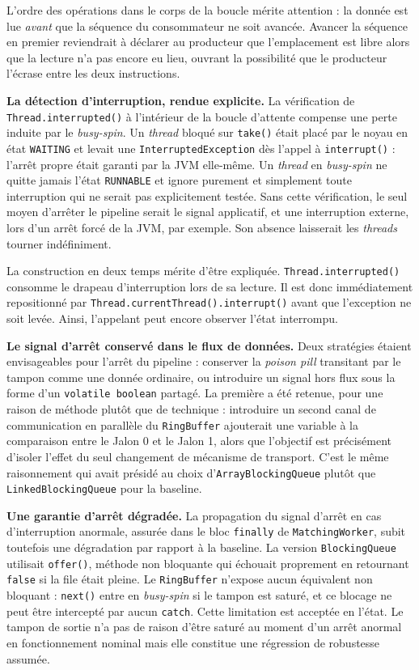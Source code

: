 L'ordre des opérations dans le corps de la boucle mérite attention : la donnée est lue \textit{avant} que la séquence du consommateur ne soit avancée. Avancer la séquence en premier reviendrait à déclarer au producteur que l'emplacement est libre alors que la lecture n'a pas encore eu lieu, ouvrant la possibilité que le producteur l'écrase entre les deux instructions.

\textbf{La détection d'interruption, rendue explicite.} La vérification de \texttt{Thread.interrupted()} à l'intérieur de la boucle d'attente compense une perte induite par le \textit{busy-spin}. Un \textit{thread} bloqué sur \texttt{take()} était placé par le noyau en état \texttt{WAITING} et levait une \texttt{InterruptedException} dès l'appel à \texttt{interrupt()} : l'arrêt propre était garanti par la JVM elle-même. Un \textit{thread} en \textit{busy-spin} ne quitte jamais l'état \texttt{RUNNABLE} et ignore purement et simplement toute interruption qui ne serait pas explicitement testée. Sans cette vérification, le seul moyen d'arrêter le pipeline serait le signal applicatif, et une interruption externe, lors d'un arrêt forcé de la JVM, par exemple. Son absence laisserait les \textit{threads} tourner indéfiniment.

La construction en deux temps mérite d'être expliquée. \texttt{Thread.interrupted()} consomme le drapeau d'interruption lors de sa lecture. Il est donc immédiatement repositionné par \texttt{Thread.currentThread().interrupt()} avant que l'exception ne soit levée. Ainsi, l'appelant peut encore observer l'état interrompu.

\textbf{Le signal d'arrêt conservé dans le flux de données.} Deux stratégies étaient envisageables pour l'arrêt du pipeline : conserver la \textit{poison pill} transitant par le tampon comme une donnée ordinaire, ou introduire un signal hors flux sous la forme d'un \texttt{volatile boolean} partagé. La première a été retenue, pour une raison de méthode plutôt que de technique : introduire un second canal de communication en parallèle du \texttt{RingBuffer} ajouterait une variable à la comparaison entre le Jalon 0 et le Jalon 1, alors que l'objectif est précisément d'isoler l'effet du seul changement de mécanisme de transport. C'est le même raisonnement qui avait présidé au choix d'\texttt{ArrayBlockingQueue} plutôt que \texttt{LinkedBlockingQueue} pour la baseline.

\textbf{Une garantie d'arrêt dégradée.} La propagation du signal d'arrêt en cas d'interruption anormale, assurée dans le bloc \texttt{finally} de \texttt{MatchingWorker}, subit toutefois une dégradation par rapport à la baseline. La version \texttt{BlockingQueue} utilisait \texttt{offer()}, méthode non bloquante qui échouait proprement en retournant \texttt{false} si la file était pleine. Le \texttt{RingBuffer} n'expose aucun équivalent non bloquant : \texttt{next()} entre en \textit{busy-spin} si le tampon est saturé, et ce blocage ne peut être intercepté par aucun \texttt{catch}. Cette limitation est acceptée en l'état. Le tampon de sortie n'a pas de raison d'être saturé au moment d'un arrêt anormal en fonctionnement nominal mais elle constitue une régression de robustesse assumée.

